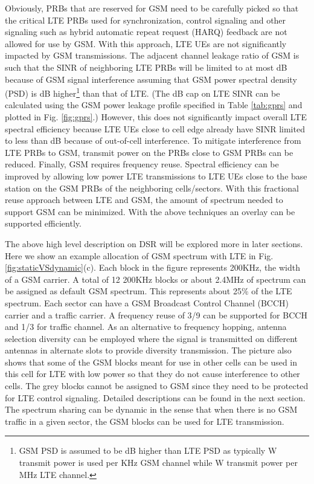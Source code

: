 \documentclass[10pt,journal]{IEEEtran}
\theoremstyle{slplain}
\begin{document}
Obviously, PRBs that are reserved for GSM need to be carefully picked so that the critical LTE PRBs used for synchronization, control signaling and other signaling such as hybrid automatic repeat request (HARQ) feedback are not allowed for use by GSM. With this approach, LTE UEs are not significantly impacted by GSM transmissions. The adjacent channel leakage ratio of GSM is such that the SINR of neighboring LTE PRBs will be limited to at most dB because of GSM signal interference assuming that GSM power spectral density (PSD) is dB higher\footnote{GSM PSD is assumed to be dB higher than LTE PSD as typically W transmit power is used per KHz GSM channel while W transmit power per MHz LTE channel.} than that of LTE. (The dB cap on LTE SINR can be calculated using the GSM power leakage profile specified in Table \ref{tab:gprs} and plotted  in Fig. \ref{fig:gprs}.) However, this does not significantly impact overall LTE spectral efficiency because LTE UEs close to cell edge already have SINR limited to less than dB because of out-of-cell interference. To mitigate interference from LTE PRBs to GSM, transmit power on the PRBs close to GSM PRBs can be reduced. Finally, GSM requires frequency reuse. Spectral efficiency can be improved by allowing low power LTE transmissions to LTE UEs close to the base station on the GSM PRBs of the neighboring cells/sectors. With this fractional reuse approach between LTE and GSM, the amount of spectrum needed to support GSM can be minimized. With the above techniques an overlay can be supported efficiently.

The above high level description on DSR will be explored more in later sections. Here we show an example allocation of GSM spectrum with LTE in Fig.\ref{fig:staticVSdynamic}(c). Each block in the figure represents 200KHz, the width of a GSM carrier. A total of 12 200KHz blocks or about 2.4MHz of spectrum can be assigned as default GSM spectrum. This represents about 25\% of the LTE spectrum. Each sector can have a GSM Broadcast Control Channel (BCCH) carrier and a traffic carrier. A frequency reuse of 3/9 can be supported for BCCH and 1/3 for traffic channel. As an alternative to frequency hopping, antenna selection diversity can be employed where the signal is transmitted on different antennas in alternate slots to provide diversity transmission. The picture also shows  that some of the GSM blocks meant for use in other cells can be used in this cell for LTE with low power so that they do not cause interference to other cells. The grey blocks cannot be assigned to GSM since they need to be protected for LTE control signaling. Detailed descriptions can be found in the next section. The spectrum sharing can be dynamic in the sense that when there is no GSM traffic in a given sector, the GSM blocks can be used for LTE transmission.
\end{document}
